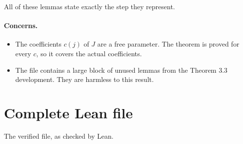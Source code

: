 \documentclass[11pt]{article}
\theoremstyle{definition}
\theoremstyle{remark}
\begin{document}
All of these lemmas state exactly the step they represent.

\paragraph{Concerns.} \begin{itemize}
\item The coefficients $c(j)$ of $J$ are a free parameter. The theorem is proved for every $c$, so it covers the actual coefficients.
\item The file contains a large block of unused lemmas from the Theorem 3.3 development. They are harmless to this result.
\end{itemize}

\appendix
\section{Complete Lean file}
The verified file, as checked by Lean.
\end{document}
